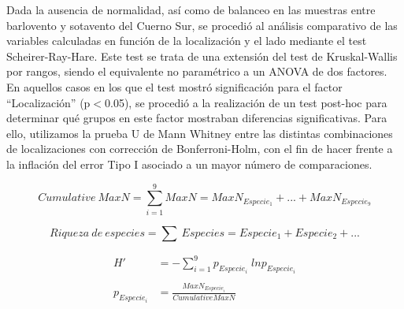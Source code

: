 \documentclass[a4paper, 11pt]{article}
\begin{document}
Dada la ausencia de normalidad, así como de balanceo en las muestras entre barlovento y sotavento del Cuerno Sur, se procedió al análisis comparativo de las variables calculadas en función de la localización y el lado mediante el test Scheirer-Ray-Hare. Este test se trata de una extensión del test de Kruskal-Wallis por rangos, siendo el equivalente no paramétrico a un ANOVA de dos factores. En aquellos casos en los que el test mostró significación para el factor “Localización” (p$<$0.05), se procedió a la realización de un test post-hoc para determinar qué grupos en este factor mostraban diferencias significativas. Para ello, utilizamos la prueba U de Mann Whitney entre las distintas combinaciones de localizaciones con corrección de Bonferroni-Holm, con el fin de hacer frente a la inflación del error Tipo I asociado a un mayor número de comparaciones.

\begin{equation}
\label{CumMaxN}
Cumulative\: MaxN = \sum_{i=1}^9MaxN=MaxN_{Especie_{1}} + ... + MaxN_{Especie_{9}}
\end{equation}

\begin{equation}
\label{Richness} 
Riqueza\:de\:especies  = \sum\:Especies = Especie_{1} + Especie_{2} + ...
\end{equation}

\begin{equation}
\label{Shannon}
\begin{split}
H' & =-\sum_{i=1}^9p_{Especie_{i}}\; lnp_{Especie_{i}}\\\\
p_{Especie_{i}} & = \frac{MaxN_{Especie_{i}}}{Cumulative MaxN}
\end{split}
\end{equation}



\end{document}
